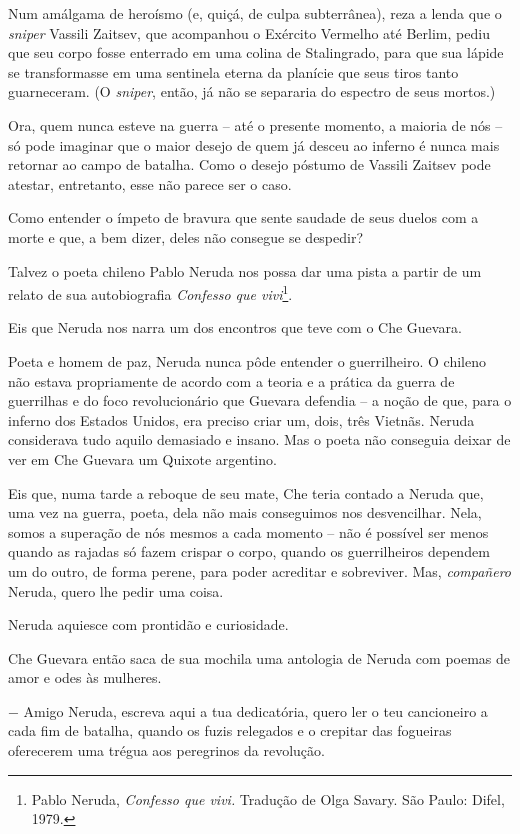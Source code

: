 Num amálgama de heroísmo (e, quiçá, de culpa subterrânea), reza a lenda
que o \emph{sniper} Vassili Zaitsev, que acompanhou o Exército Vermelho
até Berlim, pediu que seu corpo fosse enterrado em uma colina de
Stalingrado, para que sua lápide se transformasse em uma sentinela
eterna da planície que seus tiros tanto guarneceram. (O \emph{sniper},
então, já não se separaria do espectro de seus mortos.)

Ora, quem nunca esteve na guerra -- até o presente momento, a maioria de
nós -- só pode imaginar que o maior desejo de quem já desceu ao inferno
é nunca mais retornar ao campo de batalha. Como o desejo póstumo de
Vassili Zaitsev pode atestar, entretanto, esse não parece ser o caso.

Como entender o ímpeto de bravura que sente saudade de seus duelos com a
morte e que, a bem dizer, deles não consegue se despedir?

Talvez o poeta chileno Pablo Neruda nos possa dar uma pista a partir de
um relato de sua autobiografia \emph{Confesso que vivi}\footnote{Pablo
  Neruda, \emph{Confesso que vivi.} Tradução de Olga Savary. São Paulo:
  Difel, 1979.}.

Eis que Neruda nos narra um dos encontros que teve com o Che Guevara.

Poeta e homem de paz, Neruda nunca pôde entender o guerrilheiro. O
chileno não estava propriamente de acordo com a teoria e a prática da
guerra de guerrilhas e do foco revolucionário que Guevara defendia -- a
noção de que, para o inferno dos Estados Unidos, era preciso criar um,
dois, três Vietnãs. Neruda considerava tudo aquilo demasiado e insano.
Mas o poeta não conseguia deixar de ver em Che Guevara um Quixote
argentino.

Eis que, numa tarde a reboque de seu mate, Che teria contado a Neruda
que, uma vez na guerra, poeta, dela não mais conseguimos nos
desvencilhar. Nela, somos a superação de nós mesmos a cada momento --
não é possível ser menos quando as rajadas só fazem crispar o corpo,
quando os guerrilheiros dependem um do outro, de forma perene, para
poder acreditar e sobreviver. Mas, \emph{compañero} Neruda, quero lhe
pedir uma coisa.

Neruda aquiesce com prontidão e curiosidade.

Che Guevara então saca de sua mochila uma antologia de Neruda com poemas
de amor e odes às mulheres.

− Amigo Neruda, escreva aqui a tua dedicatória, quero ler o teu
cancioneiro a cada fim de batalha, quando os fuzis relegados e o
crepitar das fogueiras oferecerem uma trégua aos peregrinos da
revolução.

